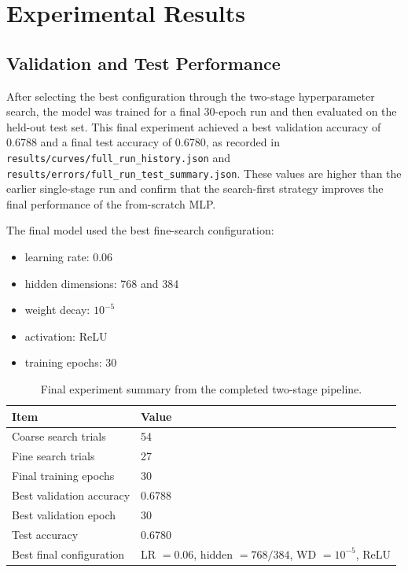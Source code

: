 \documentclass{article}
\begin{document}
\section{Experimental Results}

\subsection{Validation and Test Performance}

After selecting the best configuration through the two-stage hyperparameter search, the model was trained for a final 30-epoch run and then evaluated on the held-out test set. This final experiment achieved a best validation accuracy of 0.6788 and a final test accuracy of 0.6780, as recorded in \texttt{results/curves/full\_run\_history.json} and \texttt{results/errors/full\_run\_test\_summary.json}. These values are higher than the earlier single-stage run and confirm that the search-first strategy improves the final performance of the from-scratch MLP.

The final model used the best fine-search configuration:
\begin{itemize}
\item learning rate: 0.06
\item hidden dimensions: 768 and 384
\item weight decay: \(10^{-5}\)
\item activation: ReLU
\item training epochs: 30
\end{itemize}

\begin{table}[ht]
  \caption{Final experiment summary from the completed two-stage pipeline.}
  \label{tab:final_metrics}
  \centering
  \small
  \begin{tabular}{ll}
    \toprule
    Item & Value \\
    \midrule
    Coarse search trials & 54 \\
    Fine search trials & 27 \\
    Final training epochs & 30 \\
    Best validation accuracy & 0.6788 \\
    Best validation epoch & 30 \\
    Test accuracy & 0.6780 \\
    Best final configuration & LR \(= 0.06\), hidden \(= 768/384\), WD \(= 10^{-5}\), ReLU \\
    \bottomrule
  \end{tabular}
\end{table}
\end{document}
